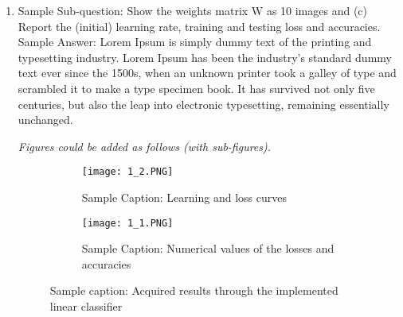 \documentclass[11pt]{scrartcl}
\begin{document}
{\begin{enumerate}[label=(\alph*)]
\textit{The mathematical equations could be included using math package as indicated here.} 
\begin{equation}
    f(x_i,W,b) = Wx_i + b
\end{equation}
\textit{Mathematical expressions could be added within the text passage as follows. Sample Text: Here, $x_i \in R^D$ each associated with a label $y_i$. Here $i=1...N$ and $y_i\in 1...K$ such that N examples, with dimensionality D, in accordance with K distinct categories.}  

Lorem Ipsum is simply dummy text of the printing and typesetting industry. Lorem Ipsum has been the industry's standard dummy text ever since the 1500s, when an unknown printer took a galley of type and scrambled it to make a type specimen book. It has survived not only five centuries, but also the leap into electronic typesetting, remaining essentially unchanged. 

\item Sample Sub-question: Show the weights matrix W as 10 images and (c) Report the (initial) learning rate, training and testing loss and accuracies.
\newline Sample Answer: Lorem Ipsum is simply dummy text of the printing and typesetting industry. Lorem Ipsum has been the industry's standard dummy text ever since the 1500s, when an unknown printer took a galley of type and scrambled it to make a type specimen book. It has survived not only five centuries, but also the leap into electronic typesetting, remaining essentially unchanged. 

\textit{Figures could be added as follows (with sub-figures).}
\begin{figure}[H]
\centering
\begin{subfigure}{.5\textwidth}
  \centering
  \texttt{[image: 1\_2.PNG]}
  \caption{Sample Caption: Learning and loss curves}
  \label{fig:sub1}
\end{subfigure}%
\begin{subfigure}{0.5\textwidth}
  \centering
  \texttt{[image: 1\_1.PNG]}
  \caption{Sample Caption: Numerical values of the losses and accuracies}
  \label{fig:sub2}
\end{subfigure}
\caption{Sample caption: Acquired results through the implemented linear classifier}
\label{fig:test}
\end{figure}
\end{enumerate}

}
\end{document}
